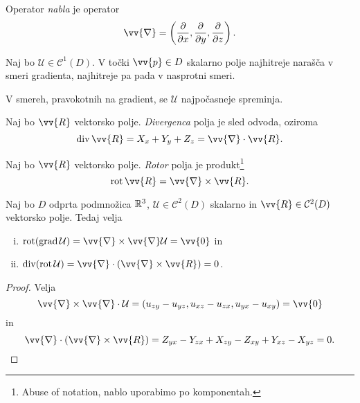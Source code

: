 \begin{definicija}
Operator \emph{nabla} je operator
\[
\vv{\nabla} = \left(
\frac{\partial}{\partial x},
\frac{\partial}{\partial y},
\frac{\partial}{\partial z}
\right).
\]
\end{definicija}

\begin{trditev}
Naj bo $\mathcal{U} \in \mathcal{C}^1(D)$. V točki $\vv{p} \in D$
skalarno polje najhitreje narašča v smeri gradienta, najhitreje pa
pada v nasprotni smeri.
\end{trditev}

\obvs

\begin{opomba}
V smereh, pravokotnih na gradient, se $\mathcal{U}$ najpočasneje
spreminja.
\end{opomba}

\begin{definicija}
Naj bo $\vv{R}$ vektorsko polje.
\emph{Divergenca} polja je sled odvoda,
oziroma
\[
\dv \vv{R} = X_x + Y_y + Z_z = \vv{\nabla} \cdot \vv{R}.
\]
\end{definicija}

\begin{definicija}
Naj bo $\vv{R}$ vektorsko polje. \emph{Rotor}
polja je produkt\footnote{Abuse of notation, nablo uporabimo po
komponentah.}
\[
\rot \vv{R} = \vv{\nabla} \times \vv{R}.
\]
\end{definicija}

\begin{trditev}
Naj bo $D$ odprta podmnožica $\mathbb{R}^3$,
$\mathcal{U} \in \mathcal{C}^2(D)$ skalarno in
$\vv{R} \in \mathcal{C}^2(D)$ vektorsko polje. Tedaj velja

\begin{enumerate}[i)]
\item $\rot(\grad \mathcal{U}) =
\vv{\nabla} \times \vv{\nabla} \mathcal{U} = \vv{0}$ in
\item $\dv(\rot \mathcal{U}) =
\vv{\nabla} \cdot \left(\vv{\nabla} \times \vv{R}\right) = 0$.
\end{enumerate}
\end{trditev}

\begin{proof}
Velja
\[
\vv{\nabla} \times \vv{\nabla} \cdot \mathcal{U} =
(u_{zy} - u_{yz}, u_{xz} - u_{zx}, u_{yx} - u_{xy}) =
\vv{0}
\]
in
\[
\vv{\nabla} \cdot \left(\vv{\nabla} \times \vv{R}\right) =
Z_{yx} - Y_{zx} + X_{zy} - Z_{xy} + Y_{xz} - X_{yz} =
0. \qedhere
\]
\end{proof}

